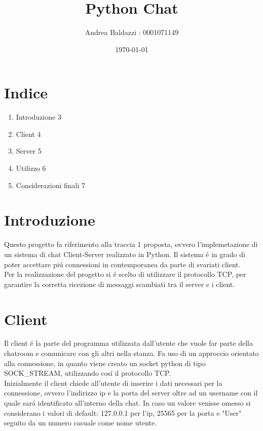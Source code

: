 \documentclass{article}
\title{Python Chat}
\author{Andrea Baldazzi : 0001071149}
\date{\today}
\begin{document}
\maketitle

\newpage

\section*{Indice}

\begin{enumerate}
  \item Introduzione 3
  \item Client 4
  \item Server 5
  \item Utilizzo 6
  \item Considerazioni finali 7
\end{enumerate}

\newpage

\section{Introduzione}

Questo progetto fa riferimento alla traccia 1 proposta, ovvero l'implemetazione di un sistema di chat Client-Server realizzato in Python. 
Il sistema \'{e} in grado di poter accettare pi\'{u} connessioni in contemporanea da parte di svariati client.\\

Per la realizzazione del progetto si \'{e} scelto di utilizzare il protocollo TCP, per garantire la corretta ricezione di messaggi scambiati tra il server e i client. 

\newpage

\section{Client}

Il client \'{e} la parte del programma utilizzata dall'utente che vuole far parte della chatroom e comunicare con gli altri nella stanza. 
Fa uso di un approccio orientato alla connessione, in quanto viene creato un socket python di tipo SOCK\_STREAM, utilizzando cos\'{i} il protocollo TCP.\\

Inizialmente il client chiede all'utente di inserire i dati necessari per la connessione, ovvero l'indirizzo ip e la porta del server oltre ad un username con il quale sar\'{a} identificato all'interno della chat. 
In caso un valore venisse omesso si considerano i valori di default: 127.0.0.1 per l'ip, 25565 per la porta e "User" seguito da un numero casuale come nome utente.\\
\end{document}
